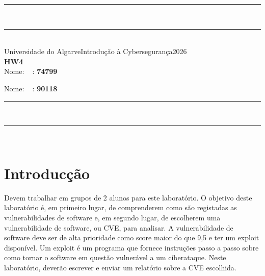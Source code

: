 \documentclass{article}
\begin{document}
\begin{center}
\rule{\textwidth}{.0075in} \\
\rule[3mm]{\textwidth}{.0075in}\\

Universidade do Algarve\hfill Introdução à Cybersegurança\hfill 2026\\[3ex]

{\Large\bf HW4} \\[3ex]

\vspace*{0.30cm} Nome: 
   \ %
  \textnumero:  \;\textbf{74799}

\vspace*{0.30cm} Nome: 
   \ %
  \textnumero:  \;\textbf{90118}

\rule{\textwidth}{.0075in} \\
\rule[3mm]{\textwidth}{.0075in} \\
\end{center}

\bigskip

\begin{center}
\setlength{\fboxrule}{2pt}
\end{center}

\medskip

\section*{Introducção}
Devem trabalhar em grupos de 2 alunos para este laboratório. O
objetivo deste laboratório é, em primeiro lugar, de comprenderem como são registadas
as vulnerabilidades de software e, em segundo lugar, de escolherem uma vulnerabilidade
de software, ou CVE, para analisar. A vulnerabilidade de software deve ser de alta
prioridade como score maior do que 9,5 e ter um exploit disponível. Um exploit é um programa que fornece
instruções passo a passo sobre como tornar o software em questão vulnerável a um
ciberataque. Neste laboratório, deverão escrever e enviar um relatório sobre a CVE
escolhida.
\end{document}
